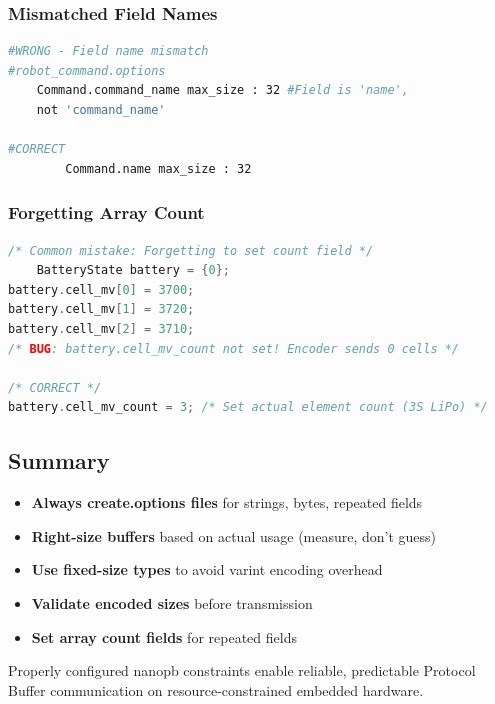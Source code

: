 \subsubsection{Mismatched Field Names
}

\begin{lstlisting}[language = bash]
#WRONG - Field name mismatch
#robot_command.options
    Command.command_name max_size : 32 #Field is 'name',
    not 'command_name'

#CORRECT
        Command.name max_size : 32


\end{lstlisting}
\subsubsection{Forgetting Array Count}

\begin{lstlisting}[language = C]
    /* Common mistake: Forgetting to set count field */
    BatteryState battery = {0};
battery.cell_mv[0] = 3700;
battery.cell_mv[1] = 3720;
battery.cell_mv[2] = 3710;
/* BUG: battery.cell_mv_count not set! Encoder sends 0 cells */

/* CORRECT */
battery.cell_mv_count = 3; /* Set actual element count (3S LiPo) */

\end{lstlisting}
\subsection{Summary}

\begin{itemize}
\item \textbf{Always create.options files} for strings, bytes, repeated fields
\item \textbf{Right-size buffers} based on actual usage (measure, don't guess)
\item \textbf{Use fixed-size types} to avoid varint encoding overhead
\item \textbf{Validate encoded sizes} before transmission
\item \textbf{Set array count fields} for repeated fields
\end{itemize}

Properly configured nanopb constraints enable reliable, predictable Protocol Buffer communication on resource-constrained embedded hardware.
